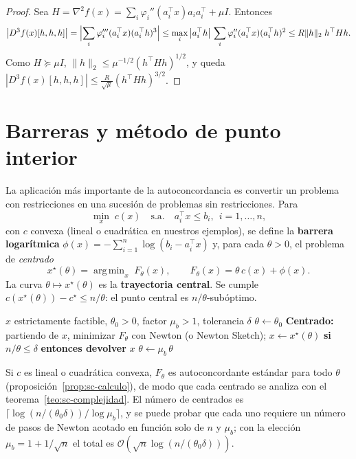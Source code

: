 \documentclass[11pt,a4paper,oneside]{book}
\theoremstyle{definition}
\theoremstyle{remark}
\newcommand{\cO}{\mathcal{O}}
\newcommand{\T}{^{\top}}
\newcommand{\nrm}[1]{\lVert #1\rVert}
\newcommand{\abs}[1]{\left\lvert #1\right\rvert}
\DeclareMathOperator*{\argmin}{arg\,min}
\begin{document}
\begin{proof}
Sea $H=\nabla^2 f(x)=\sum_i\varphi_i''(a_i\T x)a_ia_i\T+\mu I$. Entonces
\[ \abs{D^3f(x)[h,h,h]}=\Bigl|\sum_i\varphi_i'''(a_i\T x)(a_i\T h)^3\Bigr|
   \le\max_i\abs{a_i\T h}\,\sum_i\varphi_i''(a_i\T x)(a_i\T h)^2\le R\nrm{h}_2\;h\T Hh . \]
Como $H\succeq\mu I$, $\nrm{h}_2\le\mu^{-1/2}(h\T Hh)^{1/2}$, y queda
$\abs{D^3f(x)[h,h,h]}\le\tfrac{R}{\sqrt\mu}(h\T Hh)^{3/2}$.
\end{proof}

\section{Barreras y método de punto interior}\label{sec:barrera}

La aplicación más importante de la autoconcordancia es convertir un problema con restricciones en una
sucesión de problemas sin restricciones. Para
\begin{equation}\label{eq:prob-restr}
  \min_x\; c(x)\quad\text{s.a.}\quad a_i\T x\le b_i,\ \ i=1,\dots,n,
\end{equation}
con $c$ convexa (lineal o cuadrática en nuestros ejemplos), se define la \textbf{barrera logarítmica}
$\phi(x)=-\sum_{i=1}^n\log(b_i-a_i\T x)$ y, para cada $\theta>0$, el problema de \emph{centrado}
\begin{equation}\label{eq:centrado}
  x^\star(\theta)=\argmin_x\;F_\theta(x),\qquad F_\theta(x)=\theta\,c(x)+\phi(x).
\end{equation}
La curva $\theta\mapsto x^\star(\theta)$ es la \textbf{trayectoria central}. Se cumple
$c(x^\star(\theta))-c^\star\le n/\theta$: el punto central es $n/\theta$-subóptimo.

\begin{algorithm}[ht]
\caption{Método de barrera (seguimiento de la trayectoria central)}\label{alg:barrera}
\begin{algorithmic}[1]
\Require $x$ estrictamente factible, $\theta_0>0$, factor $\mu_b>1$, tolerancia $\delta$
\State $\theta\gets\theta_0$
\Repeat
  \State \textbf{Centrado:} partiendo de $x$, minimizar $F_\theta$ con Newton (o Newton Sketch); $x\gets x^\star(\theta)$
  \State \textbf{si} $n/\theta\le\delta$ \textbf{entonces devolver} $x$
  \State $\theta\gets\mu_b\,\theta$
\end{algorithmic}
\end{algorithm}

Si $c$ es lineal o cuadrática convexa, $F_\theta$ es autoconcordante estándar para todo $\theta$
(proposición~\ref{prop:sc-calculo}), de modo que cada centrado se analiza con el
teorema~\ref{teo:sc-complejidad}. El número de centrados es $\lceil\log(n/(\theta_0\delta))/\log\mu_b\rceil$, y
se puede probar que cada uno requiere un número de pasos de Newton acotado en función solo de $n$ y $\mu_b$;
con la elección $\mu_b=1+1/\sqrt n$ el total es $\cO(\sqrt n\log(n/(\theta_0\delta)))$.
\end{document}
